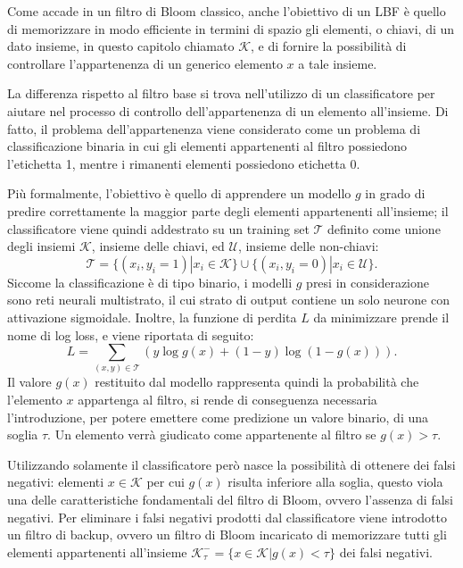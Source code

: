 \documentclass[../../main.tex]{subfiles}
\begin{document}
    Come accade in un filtro di Bloom classico, anche l'obiettivo di un LBF è quello di memorizzare in modo efficiente in termini di spazio gli elementi, o chiavi, di un dato insieme, in questo capitolo chiamato $\mathcal{K}$, e di fornire la possibilità di controllare l'appartenenza di un generico elemento $x$ a tale insieme.

    La differenza rispetto al filtro base si trova nell'utilizzo di un classificatore per aiutare nel processo di controllo dell'appartenenza di un elemento all'insieme. Di fatto, il problema dell'appartenenza viene considerato come un problema di classificazione binaria in cui gli elementi appartenenti al filtro possiedono l'etichetta 1, mentre i rimanenti elementi possiedono etichetta 0.

    Più formalmente, l'obiettivo è quello di apprendere un modello $g$ in grado di predire correttamente la maggior parte degli elementi appartenenti all'insieme; il classificatore viene quindi addestrato su un training set $\mathcal{T}$ definito come unione degli insiemi $\mathcal{K}$, insieme delle chiavi, ed $\mathcal{U}$, insieme delle non-chiavi:
    \begin{equation}
        \mathcal{T} = \{(x_i, y_i = 1) | x_i \in \mathcal{K}\} \cup \{(x_i, y_i = 0) | x_i \in \mathcal{U}\}.
    \end{equation}
    Siccome la classificazione è di tipo binario, i modelli $g$ presi in considerazione sono reti neurali multistrato, il cui strato di output contiene un solo neurone con attivazione sigmoidale. Inoltre, la funzione di perdita $L$ da minimizzare prende il nome di log loss, e viene riportata di seguito:
    \begin{equation}
        L = \sum_{(x,y) \in \mathcal{T}}\left(y \log g(x) + (1 - y) \log(1 - g(x))\right).
        \label{eqn:logloss}
    \end{equation}
    Il valore $g(x)$ restituito dal modello rappresenta quindi la probabilità che l'elemento $x$ appartenga al filtro, si rende di conseguenza necessaria l'introduzione, per potere emettere come predizione un valore binario, di una soglia $\tau$. Un elemento verrà giudicato come appartenente al filtro se $g(x) > \tau$.
    
    Utilizzando solamente il classificatore però nasce la possibilità di ottenere dei falsi negativi: elementi $x \in \mathcal{K}$ per cui $g(x)$ risulta inferiore alla soglia, questo viola una delle caratteristiche fondamentali del filtro di Bloom, ovvero l'assenza di falsi negativi. Per eliminare i falsi negativi prodotti dal classificatore viene introdotto un filtro di backup, ovvero un filtro di Bloom incaricato di memorizzare tutti gli elementi appartenenti all'insieme $\mathcal{K}_{\tau}^- = \{x \in \mathcal{K} | g(x) < \tau\}$ dei falsi negativi.
\end{document}
